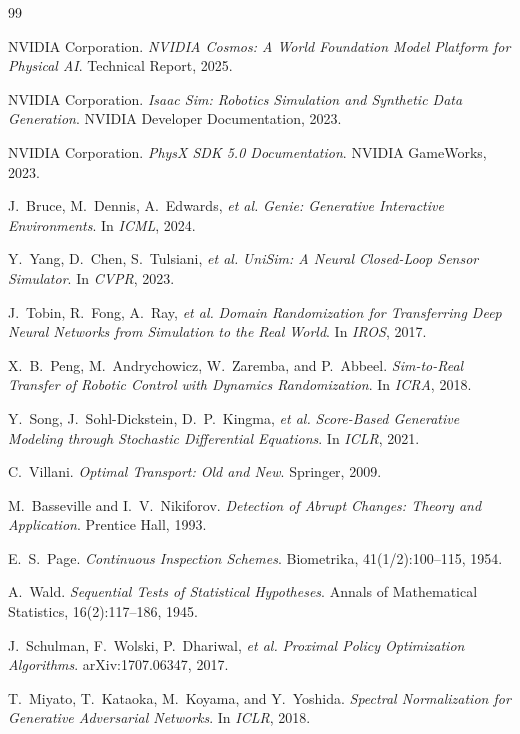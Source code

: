 \documentclass[11pt,twocolumn]{article}
\theoremstyle{definition}
\begin{document}
\begin{thebibliography}{99}

NVIDIA Corporation.
\emph{NVIDIA Cosmos: A World Foundation Model Platform for Physical AI}.
Technical Report, 2025.

NVIDIA Corporation.
\emph{Isaac Sim: Robotics Simulation and Synthetic Data Generation}.
NVIDIA Developer Documentation, 2023.

NVIDIA Corporation.
\emph{PhysX SDK 5.0 Documentation}.
NVIDIA GameWorks, 2023.

J.~Bruce, M.~Dennis, A.~Edwards, \emph{et al.}
\emph{Genie: Generative Interactive Environments}.
In \emph{ICML}, 2024.

Y.~Yang, D.~Chen, S.~Tulsiani, \emph{et al.}
\emph{UniSim: A Neural Closed-Loop Sensor Simulator}.
In \emph{CVPR}, 2023.

J.~Tobin, R.~Fong, A.~Ray, \emph{et al.}
\emph{Domain Randomization for Transferring Deep Neural Networks from
Simulation to the Real World}.
In \emph{IROS}, 2017.

X.~B.~Peng, M.~Andrychowicz, W.~Zaremba, and P.~Abbeel.
\emph{Sim-to-Real Transfer of Robotic Control with Dynamics Randomization}.
In \emph{ICRA}, 2018.

Y.~Song, J.~Sohl-Dickstein, D.~P.~Kingma, \emph{et al.}
\emph{Score-Based Generative Modeling through Stochastic Differential
Equations}.
In \emph{ICLR}, 2021.

C.~Villani.
\emph{Optimal Transport: Old and New}.
Springer, 2009.

M.~Basseville and I.~V.~Nikiforov.
\emph{Detection of Abrupt Changes: Theory and Application}.
Prentice Hall, 1993.

E.~S.~Page.
\emph{Continuous Inspection Schemes}.
Biometrika, 41(1/2):100--115, 1954.

A.~Wald.
\emph{Sequential Tests of Statistical Hypotheses}.
Annals of Mathematical Statistics, 16(2):117--186, 1945.

J.~Schulman, F.~Wolski, P.~Dhariwal, \emph{et al.}
\emph{Proximal Policy Optimization Algorithms}.
arXiv:1707.06347, 2017.

T.~Miyato, T.~Kataoka, M.~Koyama, and Y.~Yoshida.
\emph{Spectral Normalization for Generative Adversarial Networks}.
In \emph{ICLR}, 2018.


\end{thebibliography}
\end{document}
